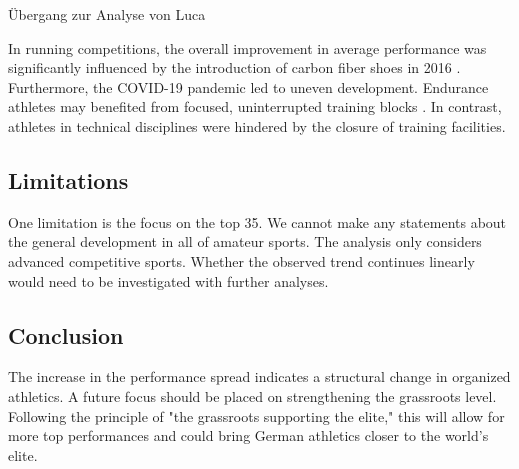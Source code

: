 \documentclass{article}
\begin{document}
Übergang zur Analyse von Luca

In running competitions, the overall improvement in average performance was significantly influenced by the introduction of carbon fiber shoes in 2016 \citep{willwacherDoesAdvancedFootwear2023}. Furthermore, the COVID-19 pandemic led to uneven development. Endurance athletes may benefited from focused, uninterrupted training blocks \citep{venkatesanRunningPerformanceCOVID192022}. In contrast, athletes in technical disciplines were hindered by the closure of training facilities.

\subsection*{Limitations}

One limitation is the focus on the top 35. We cannot make any statements about the general development in all of amateur sports. The analysis only considers advanced competitive sports. Whether the observed trend continues linearly would need to be investigated with further analyses.

\subsection*{Conclusion}

The increase in the performance spread indicates a structural change in organized athletics. 
A future focus should be placed on strengthening the grassroots level. 
Following the principle of "the grassroots supporting the elite," this will allow for more top performances and could bring German athletics closer to the world's elite.

\newpage



\end{document}
